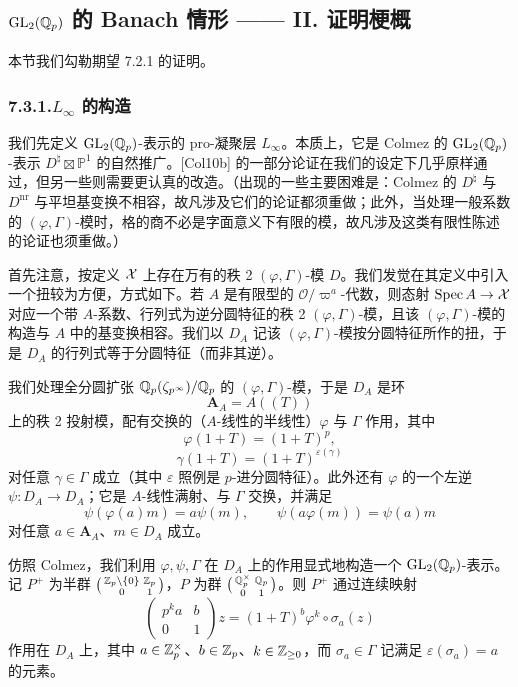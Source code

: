 \subsection{$\mathrm{GL}_2(\mathbb{Q}_p)$ 的 Banach 情形 —— II. 证明梗概}

本节我们勾勒期望 7.2.1 的证明。

\subsubsection*{7.3.1.\quad $L_\infty$ 的构造}

我们先定义 $\mathrm{GL}_2(\mathbb{Q}_p)$-表示的 pro-凝聚层 $L_\infty$。本质上，它是 Colmez 的 $\mathrm{GL}_2(\mathbb{Q}_p)$-表示 $D^\natural\boxtimes\mathbb P^1$ 的自然推广。[Col10b] 的一部分论证在我们的设定下几乎原样通过，但另一些则需要更认真的改造。（出现的一些主要困难是：Colmez 的 $D^\natural$ 与 $D^{\mathrm{nr}}$ 与平坦基变换不相容，故凡涉及它们的论证都须重做；此外，当处理一般系数的 $(\varphi,\Gamma)$-模时，格的商不必是字面意义下有限的模，故凡涉及这类有限性陈述的论证也须重做。）

首先注意，按定义 $\mathcal{X}$ 上存在万有的秩 2 $(\varphi,\Gamma)$-模 $D$。我们发觉在其定义中引入一个扭较为方便，方式如下。若 $A$ 是有限型的 $\mathcal O/\varpi^a$-代数，则态射 $\operatorname{Spec} A\to\mathcal{X}$ 对应一个带 $A$-系数、行列式为逆分圆特征的秩 2 $(\varphi,\Gamma)$-模，且该 $(\varphi,\Gamma)$-模的构造与 $A$ 中的基变换相容。我们以 $D_A$ 记该 $(\varphi,\Gamma)$-模按分圆特征所作的扭，于是 $D_A$ 的行列式等于分圆特征（而非其逆）。

我们处理全分圆扩张 $\mathbb{Q}_p(\zeta_{p^\infty})/\mathbb{Q}_p$ 的 $(\varphi,\Gamma)$-模，于是 $D_A$ 是环
\[
\mathbf A_A=A((T))
\]
上的秩 2 投射模，配有交换的（$A$-线性的半线性）$\varphi$ 与 $\Gamma$ 作用，其中
\[
\varphi(1+T)=(1+T)^p,
\]
\[
\gamma(1+T)=(1+T)^{\varepsilon(\gamma)}
\]
对任意 $\gamma\in\Gamma$ 成立（其中 $\varepsilon$ 照例是 $p$-进分圆特征）。此外还有 $\varphi$ 的一个左逆 $\psi:D_A\to D_A$；它是 $A$-线性满射、与 $\Gamma$ 交换，并满足
\[
\psi(\varphi(a)m)=a\psi(m),\qquad
\psi(a\varphi(m))=\psi(a)m
\]
对任意 $a\in\mathbf A_A$、$m\in D_A$ 成立。

仿照 Colmez，我们利用 $\varphi,\psi,\Gamma$ 在 $D_A$ 上的作用显式地构造一个 $\mathrm{GL}_2(\mathbb{Q}_p)$-表示。记 $P^+$ 为半群 $\bigl(\begin{smallmatrix}\mathbb{Z}_p\setminus\{0\}&\mathbb{Z}_p\\0&1\end{smallmatrix}\bigr)$，$P$ 为群 $\bigl(\begin{smallmatrix}\mathbb{Q}_p^\times&\mathbb{Q}_p\\0&1\end{smallmatrix}\bigr)$。则 $P^+$ 通过连续映射
\[
\begin{pmatrix}p^ka&b\\0&1\end{pmatrix}z=(1+T)^b\varphi^k\circ\sigma_a(z)
\]
作用在 $D_A$ 上，其中 $a\in\mathbb{Z}_p^\times$、$b\in\mathbb{Z}_p$、$k\in\mathbb{Z}_{\ge0}$，而 $\sigma_a\in\Gamma$ 记满足 $\varepsilon(\sigma_a)=a$ 的元素。

